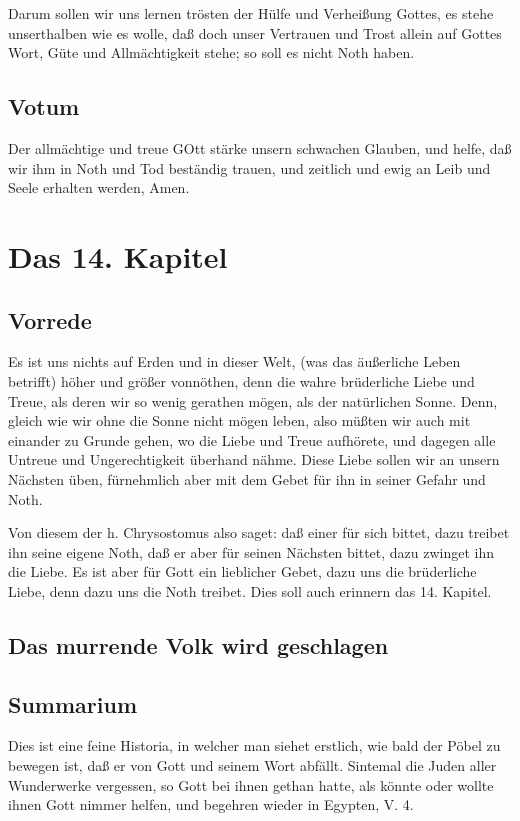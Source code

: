 Darum sollen wir uns lernen trösten der Hülfe und Verheißung Gottes, es stehe unserthalben wie es wolle, daß doch unser Vertrauen und Trost allein auf Gottes Wort, Güte und Allmächtigkeit stehe; so soll es nicht Noth haben.

\section{Votum}

Der allmächtige und treue GOtt stärke unsern schwachen Glauben, und helfe, daß wir ihm in Noth und Tod beständig trauen, und zeitlich und ewig an Leib und Seele erhalten werden, Amen.

\chapter{Das 14. Kapitel}

\section{Vorrede}

Es ist uns nichts auf Erden und in dieser Welt, (was das äußerliche Leben betrifft) höher und größer vonnöthen, denn die wahre brüderliche Liebe und Treue, als deren wir so wenig gerathen mögen, als der natürlichen Sonne. Denn, gleich wie wir ohne die Sonne nicht mögen leben, also müßten wir auch mit einander zu Grunde gehen, wo die Liebe und Treue aufhörete, und dagegen alle Untreue und Ungerechtigkeit überhand nähme. Diese Liebe sollen wir an unsern Nächsten üben, fürnehmlich aber mit dem Gebet für ihn in seiner Gefahr und Noth.

Von diesem der h. Chrysostomus also saget: daß einer für sich bittet, dazu treibet ihn seine eigene Noth, daß er aber für seinen Nächsten bittet, dazu zwinget ihn die Liebe. Es ist aber für Gott ein lieblicher Gebet, dazu uns die brüderliche Liebe, denn dazu uns die Noth treibet. Dies soll auch erinnern das 14. Kapitel.

\section{Das murrende Volk wird geschlagen}

\section{Summarium}

Dies ist eine feine Historia, in welcher man siehet erstlich, wie bald der Pöbel zu bewegen ist, daß er von Gott und seinem Wort abfällt. Sintemal die Juden aller Wunderwerke vergessen, so Gott bei ihnen gethan hatte, als könnte oder wollte ihnen Gott nimmer helfen, und begehren wieder in Egypten, V. 4.

